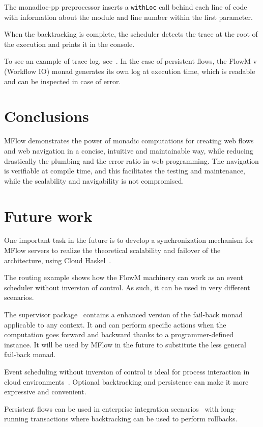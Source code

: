 \documentclass{tmr}
\begin{document}
The monadloc-pp preprocessor inserts a {\tt withLoc} call behind each line of code with information about the module and line number within the first parameter. 

When the backtracking is complete, the scheduler detects the trace at the root of the execution and prints it in the console.
 
To see an example of trace log, see~\cite{auth:trace}. In the case of persistent flows, the FlowM v (Workflow IO) monad generates its own log at execution time, which is readable and can be inspected in case of error. 
 
\section{Conclusions} 
 
MFlow demonstrates the power of monadic computations for creating web flows and web navigation in a concise, intuitive and maintainable way, while reducing drastically the plumbing and the error ratio in web programming.  The navigation is verifiable at compile time, and this facilitates the testing and maintenance, while the scalability and navigability is not compromised.  
  
\section{Future work}  
  
One important task in the future is to develop a synchronization mechanism for MFlow servers to realize the theoretical scalability and failover of the architecture, using Cloud Haskel~\cite{auth:cloudhaskell}.  
  
The routing example shows how the FlowM machinery can work as an event scheduler without inversion of control.  As such, it can be used in very different scenarios. 

The supervisor package~\cite{auth:supervisor} contains a enhanced version of the fail-back monad applicable to any context. It  and can perform specific actions when the computation goes forward and backward thanks to a programmer-defined instance. It will  be used by MFlow in the future to substitute the less general fail-back monad.


Event scheduling without inversion of control is ideal for process interaction in cloud environments~\cite{auth:scalacloud}. Optional backtracking and persistence can make it more expressive and convenient.  
  
Persistent flows can be used in enterprise integration scenarios~\cite{auth:integration} with long-running transactions where backtracking can be used to perform rollbacks.
  
  
  
  
\end{document}

